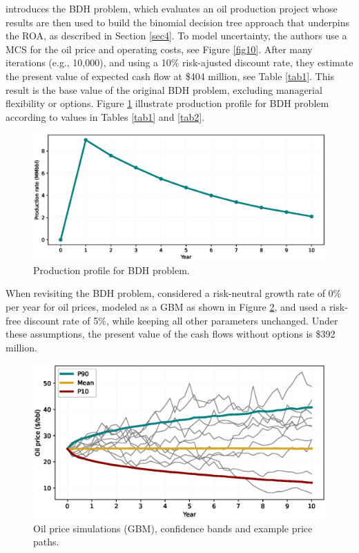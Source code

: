 \documentclass[pdflatex,sn-basic]{sn-jnl}%
\theoremstyle{thmstyleone}%
\theoremstyle{thmstyletwo}%
\theoremstyle{thmstylethree}%
\begin{document}
\cite{ref12a} introduces the BDH problem, which evaluates an oil production project whose results are then used to build the binomial decision tree approach that underpins the ROA, as described in Section \ref{sec4}. To model uncertainty, the authors use a MCS for the oil price and operating costs, see Figure \ref{fig10}. After many iterations (e.g., 10,000), and using a 10\% risk-ajusted discount rate, they estimate the present value of expected cash flow at \$404 million, see Table \ref{tab1}. This result is the base value of the original BDH problem, excluding managerial flexibility or options. Figure \ref{fig13} illustrate production profile for BDH problem according to values in Tables \ref{tab1} and \ref{tab2}.

\begin{figure}[H]
\centering
\begin{minipage}{0.95\textwidth}
  \includegraphics[width=\textwidth]{prod_profile.eps}
  \caption{Production profile for BDH problem.}
  \label{fig13}
\end{minipage}
\end{figure}

When revisiting the BDH problem, \cite{ref13} considered a risk-neutral growth rate of 0\% per year for oil prices, modeled as a GBM as shown in Figure \ref{fig14}, and used a risk-free discount rate of 5\%, while keeping all other parameters unchanged. Under these assumptions, the present value of the cash flows without options is \$392 million.

\begin{figure}[H]
\centering
\begin{minipage}{0.95\textwidth}
  \includegraphics[width=\textwidth]{Oil_profile.eps}
  \caption{Oil price simulations (GBM), confidence bands and example price paths.}
  \label{fig14}
\end{minipage}
\end{figure}
\end{document}
